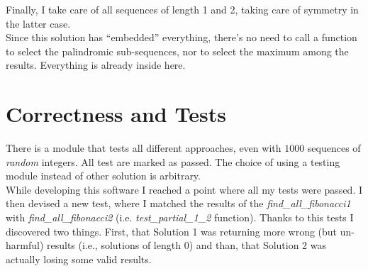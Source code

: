 \documentclass[12pt]{article}
\begin{document}
Finally, I take care of all sequences of length 1 and 2, taking care of symmetry in the latter case.\\
Since this solution has ``embedded'' everything, there's no need to call a function to select the palindromic sub-sequences, nor to select the maximum among the results. Everything is already inside here. 

\section{Correctness and Tests}
There is a module that tests all different approaches, even with $1000$ sequences of \emph{random} integers. All test are marked as passed.  The choice of using a testing module instead of other solution is arbitrary.\\

While developing this software I reached a point where all my tests were passed. I then devised a new test, where I matched the results of the \emph{find\_all\_fibonacci1} with \emph{find\_all\_fibonacci2} (i.e. \emph{test\_partial\_1\_2} function). Thanks to this tests I discovered two things. First, that Solution 1 was returning more wrong (but un-harmful) results (i.e., solutions of length 0) and than, that Solution 2 was actually losing some valid results.
\end{document}
